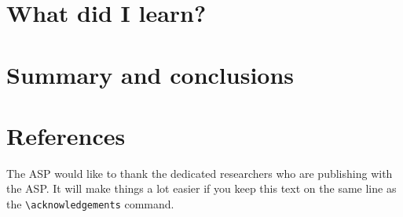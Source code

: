 \documentclass[11pt,twoside]{article}
\begin{document}
\section{What did I learn?}


\section{Summary and conclusions}



\section{References}


\acknowledgements The ASP would like to thank the dedicated researchers who are publishing with the ASP.  It will make things a lot easier if you keep this text on the same line as the \verb"\acknowledgements" command.


\end{document}
